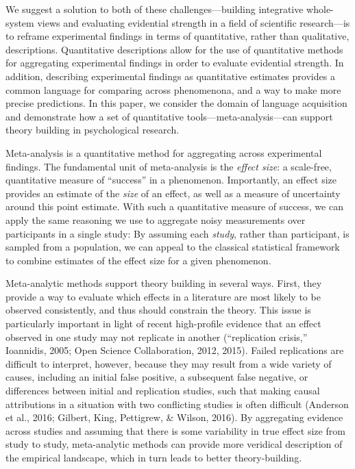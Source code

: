 \documentclass[english,floatsintext,man]{apa6}
\begin{document}
We suggest a solution to both of these challenges---building integrative
whole-system views and evaluating evidential strength in a field of
scientific research---is to reframe experimental findings in terms of
quantitative, rather than qualitative, descriptions. Quantitative
descriptions allow for the use of quantitative methods for aggregating
experimental findings in order to evaluate evidential strength. In
addition, describing experimental findings as quantitative estimates
provides a common language for comparing across phenomenona, and a way
to make more precise predictions. In this paper, we consider the domain
of language acquisition and demonstrate how a set of quantitative
tools---meta-analysis---can support theory building in psychological
research.

Meta-analysis is a quantitative method for aggregating across
experimental findings. The fundamental unit of meta-analysis is the
\emph{effect size}: a scale-free, quantitative measure of
\enquote{success} in a phenomenon. Importantly, an effect size provides
an estimate of the \emph{size} of an effect, as well as a measure of
uncertainty around this point estimate. With such a quantitative measure
of success, we can apply the same reasoning we use to aggregate noisy
measurements over participants in a single study: By assuming each
\emph{study}, rather than participant, is sampled from a population, we
can appeal to the classical statistical framework to combine estimates
of the effect size for a given phenomenon.

Meta-analytic methods support theory building in several ways. First,
they provide a way to evaluate which effects in a literature are most
likely to be observed consistently, and thus should constrain the
theory. This issue is particularly important in light of recent
high-profile evidence that an effect observed in one study may not
replicate in another (``replication crisis,'' Ioannidis, 2005; Open
Science Collaboration, 2012, 2015). Failed replications are difficult to
interpret, however, because they may result from a wide variety of
causes, including an initial false positive, a subsequent false
negative, or differences between initial and replication studies, such
that making causal attributions in a situation with two conflicting
studies is often difficult (Anderson et al., 2016; Gilbert, King,
Pettigrew, \& Wilson, 2016). By aggregating evidence across studies and
assuming that there is some variability in true effect size from study
to study, meta-analytic methods can provide more veridical description
of the empirical landscape, which in turn leads to better
theory-building.
\end{document}
